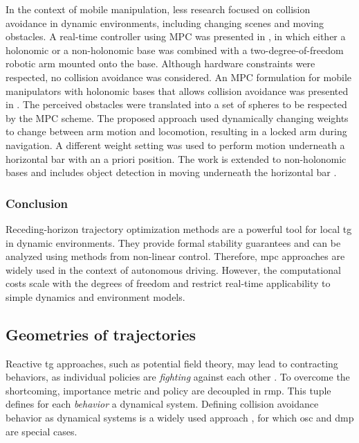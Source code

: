 In the context of mobile manipulation, less research focused on collision
avoidance in dynamic environments, including changing scenes and moving
obstacles. A real-time controller using MPC was presented in \cite{Ide2011}, in
which either a holonomic or a non-holonomic base was combined with a
two-degree-of-freedom robotic arm mounted onto the base. Although hardware
constraints were respected, no collision avoidance was considered.  An MPC
formulation for mobile manipulators with holonomic bases that allows collision
avoidance was presented in \cite{Avanzini2015}. The perceived obstacles were
translated into a set of spheres to be respected by the MPC scheme. The proposed
approach used dynamically changing weights to change between arm motion and
locomotion, resulting in a locked arm during navigation. A different weight
setting was used to perform motion underneath a horizontal bar with an a priori
position. The work is extended to non-holonomic bases and includes object
detection in moving underneath the horizontal bar \cite{Avanzini2018}. 



\subsubsection{Conclusion}

Receding-horizon trajectory optimization methods are a
powerful tool for local \ac{tg} in dynamic environments.
They provide formal stability guarantees and can be analyzed
using methods from non-linear control. Therefore, \ac{mpc}
approaches are widely used in the context of autonomous
driving. However, the computational costs scale with the
degrees of freedom and restrict real-time applicability to
simple dynamics and environment models.


\subsection{Geometries of trajectories}
\label{sub:geometries_of_trajectories}

Reactive \ac{tg} approaches, such as potential field theory,
may lead to contracting behaviors, as individual policies
are \textit{fighting} against each other \cite{Ratliff2018}.
To overcome the shortcoming, importance metric and policy
are decoupled in \ac{rmp}. This tuple defines
for each \textit{behavior} a dynamical system.
Defining collision avoidance behavior as dynamical systems
is a widely used approach
\cite{khansari2012dynamical,huber2023avoidance}, for which
\ac{osc} \cite{Khatib1987a} and \ac{dmp}
\cite{ijspeert2013dynamical} are special cases.



